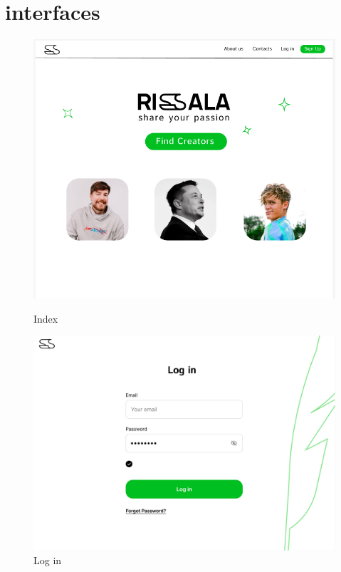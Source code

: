 \section{interfaces}
\clearpage
\begin{figure}[htbp]
    \centering
    \begin{minipage}[b]{0.7\textwidth}
        \centering
        \includegraphics[width=\textwidth]{interfaces/index.png}
        \caption{Index}
        \label{fig:index}
    \end{minipage}
    \hfill
    \begin{minipage}[b]{0.7\textwidth}
        \centering
        \includegraphics[width=\textwidth]{interfaces/log in.png}
        \caption{Log in}
        \label{fig:connexion}
    \end{minipage}
\end{figure}
